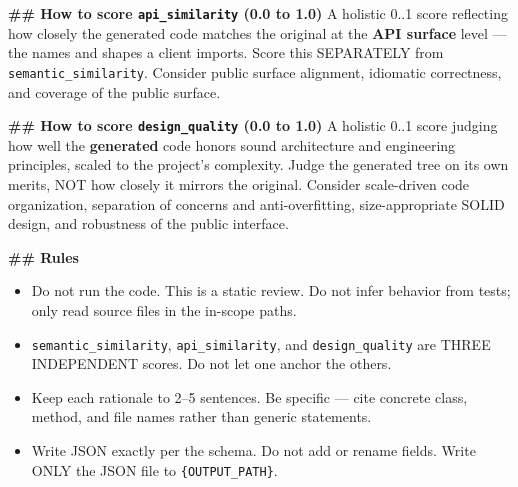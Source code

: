 \begin{promptbox}
\textbf{\#\# How to score \texttt{api\_similarity} (0.0 to 1.0)}
A holistic 0..1 score reflecting how closely the generated code matches the original at the \textbf{API surface} level --- the names and shapes a client imports. Score this SEPARATELY from \texttt{semantic\_similarity}. Consider public surface alignment, idiomatic correctness, and coverage of the public surface.

\textbf{\#\# How to score \texttt{design\_quality} (0.0 to 1.0)}
A holistic 0..1 score judging how well the \textbf{generated} code honors sound architecture and engineering principles, scaled to the project's complexity. Judge the generated tree on its own merits, NOT how closely it mirrors the original. Consider scale-driven code organization, separation of concerns and anti-overfitting, size-appropriate SOLID design, and robustness of the public interface.

\textbf{\#\# Rules}
\begin{itemize}
\item Do not run the code. This is a static review. Do not infer behavior from tests; only read source files in the in-scope paths.
\item \texttt{semantic\_similarity}, \texttt{api\_similarity}, and \texttt{design\_quality} are THREE INDEPENDENT scores. Do not let one anchor the others.
\item Keep each rationale to 2--5 sentences. Be specific --- cite concrete class, method, and file names rather than generic statements.
\item Write JSON exactly per the schema. Do not add or rename fields. Write ONLY the JSON file to \texttt{\{OUTPUT\_PATH\}}.
\end{itemize}
\end{promptbox}
